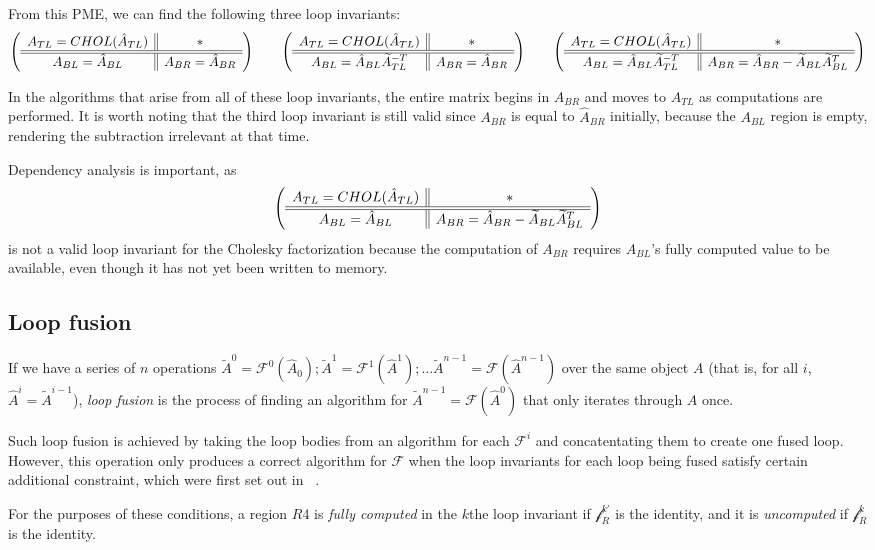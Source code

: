 \documentclass[12pt,letterpaper]{article}
\newcommand*{\mycite}[1]{~\cite{#1}}
\newcommand*{\opF}{\mathcal{F}}
\newcommand*{\opf}{\mathcal{f}}
\begin{document}
From this PME, we can find the following three loop invariants:
\begin{equation*}
  \left( \begin{array}{c || c} A_{TL} = CHOL(\hat{A}_{TL}) & * \\ \hline \hline A_{BL} = \hat{A}_{BL} & A_{BR} = \hat{A}_{BR} \end{array} \right) \qquad
  \left( \begin{array}{c || c} A_{TL} = CHOL(\hat{A}_{TL}) & * \\ \hline \hline A_{BL} = \hat{A}_{BL}\widetilde{A}_{TL}^{-T} & A_{BR} = \hat{A}_{BR} \end{array} \right) \qquad
  \left( \begin{array}{c || c} A_{TL} = CHOL(\hat{A}_{TL}) & * \\ \hline \hline A_{BL} = \hat{A}_{BL}\widetilde{A}_{TL}^{-T} & A_{BR} = \hat{A}_{BR} - \widetilde{A}_{BL}\widetilde{A}_{BL}^T \end{array} \right)
\end{equation*}

In the algorithms that arise from all of these loop invariants, the entire matrix begins in $A_{BR}$ and moves to $A_{TL}$ as computations are performed.
It is worth noting that the third loop invariant is still valid since $A_{BR}$ is equal to $\hat{A}_{BR}$ initially, because the $A_{BL}$ region is empty, rendering the subtraction irrelevant at that time.

Dependency analysis is important, as
\begin{equation*}
  \left( \begin{array}{c || c} A_{TL} = CHOL(\hat{A}_{TL}) & * \\ \hline \hline A_{BL} = \hat{A}_{BL} & A_{BR} = \hat{A}_{BR} - \widetilde{A}_{BL}\widetilde{A}_{BL}^T \end{array} \right)
\end{equation*}
is not a valid loop invariant for the Cholesky factorization because the computation of $A_{BR}$ requires $A_{BL}$'s fully computed value to be available, even though it has not yet been written to memory.

\subsection{Loop fusion}
If we have a series of $n$ operations $\widetilde{A}^0 = \opF^0(\hat{A}_0); \widetilde{A}^1 = \opF^1(\hat{A}^1); \ldots \widetilde{A}^{n - 1} = \opF(\hat{A}^{n - 1})$
over the same object $A$ (that is, for all $i$, $\hat{A}^i = \widetilde{A}^{i - 1}$), \emph{loop fusion} is the process of finding an algorithm for $\widetilde{A}^{n - 1} = \opF(\hat{A}^0)$ that only iterates through $A$ once.

Such loop fusion is achieved by taking the loop bodies from an algorithm for each $\opF^i$ and concatentating them to create one fused loop.
However, this operation only produces a correct algorithm for $\opF$ when the loop invariants for each loop being fused satisfy certain additional constraint, which were first set out in \mycite{Low2013}.

For the purposes of these conditions, a region $R$4 is \emph{fully computed} in the $k$the loop invariant if $\opf_R^{k'}$ is the identity, and it is \emph{uncomputed} if $\opf_R^k$ is the identity.
\end{document}
